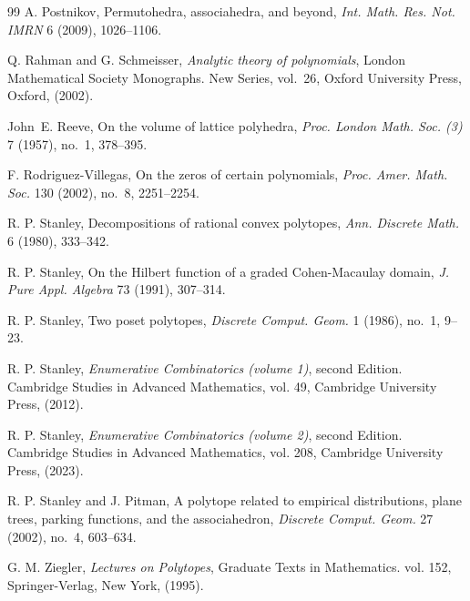 \documentclass[reqno, 12pt]{article}
\numberwithin{equation}{section}
\theoremstyle{definition}
\begin{document}
\begin{thebibliography}{99}
 A. Postnikov, Permutohedra, associahedra, and beyond, \emph{Int. Math. Res. Not. IMRN} 6 (2009), 1026--1106.

 Q. Rahman and G. Schmeisser, \emph{Analytic theory of polynomials}, London Mathematical Society Monographs. New Series, vol.~26, Oxford University Press, Oxford, (2002).

 John~E. Reeve, On the volume of lattice polyhedra, \emph{Proc. London Math. Soc. (3)} 7 (1957), no.~1, 378--395.

 F. Rodriguez-Villegas, On the zeros of certain polynomials, \emph{Proc. Amer. Math. Soc.} 130 (2002), no.~8, 2251--2254.

 R. P. Stanley, Decompositions of rational convex polytopes, \emph{Ann. Discrete Math.} 6 (1980), 333--342.

 R. P. Stanley, On the Hilbert function of a graded Cohen-Macaulay domain, \emph{J. Pure Appl. Algebra} 73 (1991), 307--314.

 R. P. Stanley, Two poset polytopes, \emph{Discrete Comput. Geom.} 1 (1986), no.~1, 9--23.

 R. P. Stanley, \emph{Enumerative Combinatorics (volume 1)}, second Edition. Cambridge Studies in Advanced Mathematics, vol. 49, Cambridge University Press, (2012).

 R. P. Stanley, \emph{Enumerative Combinatorics (volume 2)}, second Edition. Cambridge Studies in Advanced Mathematics, vol. 208, Cambridge University Press, (2023).
    
 R. P. Stanley and J. Pitman, A polytope related to empirical distributions, plane trees, parking functions, and the associahedron, \emph{Discrete Comput. Geom.} 27 (2002), no.~4, 603--634.
    
 G. M. Ziegler, \emph{Lectures on Polytopes}, Graduate Texts in Mathematics. vol. 152, Springer-Verlag, New York,  (1995).

\end{thebibliography}
\end{document}
